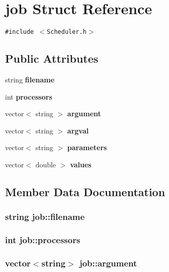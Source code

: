 \section{job Struct Reference}
\label{structjob}
{\tt \#include $<$Scheduler.h$>$}

\subsection*{Public Attributes}
\begin{CompactItemize}
\item 
string {\bf filename}
\item 
int {\bf processors}
\item 
vector$<$ string $>$ {\bf argument}
\item 
vector$<$ string $>$ {\bf argval}
\item 
vector$<$ string $>$ {\bf parameters}
\item 
vector$<$ double $>$ {\bf values}
\end{CompactItemize}


\subsection{Member Data Documentation}
\subsubsection{\setlength{\rightskip}{0pt plus 5cm}string {\bf job::filename}}\label{structjob_534c92b3c1e96bc5bf0c6a565e5583c5}


\subsubsection{\setlength{\rightskip}{0pt plus 5cm}int {\bf job::processors}}\label{structjob_86b119c212fb8de8f831e946a328e445}


\subsubsection{\setlength{\rightskip}{0pt plus 5cm}vector$<$string$>$ {\bf job::argument}}\label{structjob_7421a2f437783b5a77f30afb8f7e95f5}


